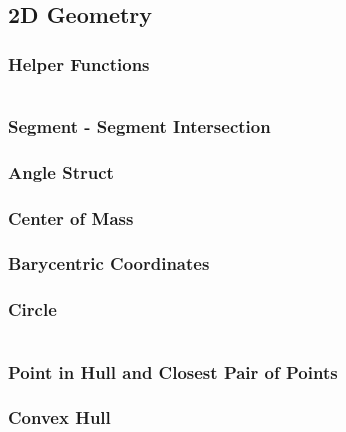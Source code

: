 \subsection{2D Geometry}
\subsubsection{Helper Functions}

\noindent \hrulefill \vspace{-\baselineskip}
\begin{multicols}{2}
\inputminted[autogobble,fontsize=\tiny]{C++}{Geometry/random_geometry.cpp}
\end{multicols}
\vspace{-\baselineskip}
\noindent \hrulefill

\subsubsection{Segment - Segment Intersection}
\subsubsection{Angle Struct}
\subsubsection{Center of Mass}
\subsubsection{Barycentric Coordinates}
\subsubsection{Circle}

\noindent \hrulefill \vspace{-\baselineskip}
\begin{multicols}{2}
\inputminted[autogobble,fontsize=\tiny]{C++}{Geometry/circle.cpp}
\end{multicols}
\vspace{-\baselineskip}
\noindent \hrulefill

\subsubsection{Point in Hull and Closest Pair of Points}
\subsubsection{Convex Hull}

